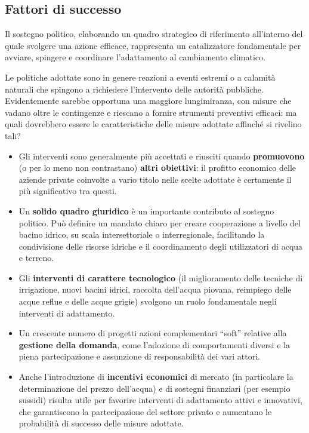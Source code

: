 \documentclass[14pt,a4paper]{article}
\begin{document}
		\subsection{Fattori di successo}
		
		Il sostegno politico, elaborando un quadro strategico di riferimento all'interno del quale svolgere una azione efficace, rappresenta un catalizzatore fondamentale per avviare, spingere e coordinare l'adattamento al cambiamento climatico. 
		
		Le politiche adottate sono in genere reazioni a eventi estremi o a calamità naturali che spingono a richiedere l'intervento delle autorità pubbliche. Evidentemente sarebbe opportuna una maggiore lungimiranza, con misure che vadano oltre le contingenze e riescano a fornire strumenti preventivi efficaci: ma quali dovrebbero essere le caratteristiche delle misure adottate affinché si rivelino tali?
		
		\begin{itemize}
			\item Gli interventi sono generalmente più accettati e riusciti quando \textbf{promuovono} (o per lo meno non contrastano) \textbf{altri obiettivi}: il
			profitto economico delle aziende private coinvolte a vario titolo nelle scelte adottate è certamente il più significativo tra questi.
			\item Un \textbf{solido quadro giuridico} è un importante contributo al sostegno politico. Può definire un mandato chiaro per creare cooperazione a livello del bacino idrico, su scala intersettoriale
			o interregionale, facilitando la condivisione delle risorse idriche e il coordinamento degli utilizzatori di acqua e terreno.
			\item Gli \textbf{interventi di carattere tecnologico} (il miglioramento delle tecniche di irrigazione, nuovi bacini idrici, raccolta dell'acqua piovana, reimpiego delle acque reflue e delle acque
			grigie) svolgono un ruolo fondamentale negli interventi di adattamento.
			\item Un crescente numero di progetti 	azioni complementari ``soft'' relative alla \textbf{gestione della domanda}, come l'adozione di comportamenti diversi e la piena partecipazione e assunzione di responsabilità dei vari attori. 
			\item Anche l'introduzione di \textbf{incentivi economici} di mercato (in particolare la determinazione del prezzo dell'acqua) e di sostegni finanziari (per esempio sussidi) risulta utile per favorire interventi di adattamento attivi e innovativi,
			che garantiscono la partecipazione del settore privato e aumentano le probabilità di successo delle misure adottate.
		\end{itemize}
		
\end{document}
